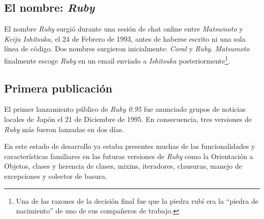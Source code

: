 \subsection{El nombre: \textit{Ruby}}
El nombre \textit{Ruby} surgió durante una sesión de chat online entre \textit{Matsumoto} y \textit{Keiju Ishitsuka}, el 24 de Febrero de 1993, antes de haberse escrito ni una sola línea de código. Dos nombres surgieron inicialmente: \textit{Coral} y \textit{Ruby}. \textit{Matsumoto} finalmente escoge \textit{Ruby} en un email enviado a \textit{Ishitsuka} posteriormente\footnote{Una de las razones de la decisión final fue que la piedra rubí era la ``piedra de nacimiento'' de uno de sus compañeros de trabajo.}.


\subsection{Primera publicación}
El primer lanzamiento público de \textit{Ruby 0.95} fue anunciado grupos de noticias locales de Japón el 21 de Diciembre de 1995. En consecuencia, tres versiones de \textit{Ruby} más fueron lanzadas en dos días.


En este estado de desarrollo ya estaba presentes muchas de las funcionalidades y características familiares en las futuras versiones de \textit{Ruby} como la Orientación a Objetos, clases y herencia de clases, mixins, iteradores, clausuras, manejo de excepciones y colector de basura.


